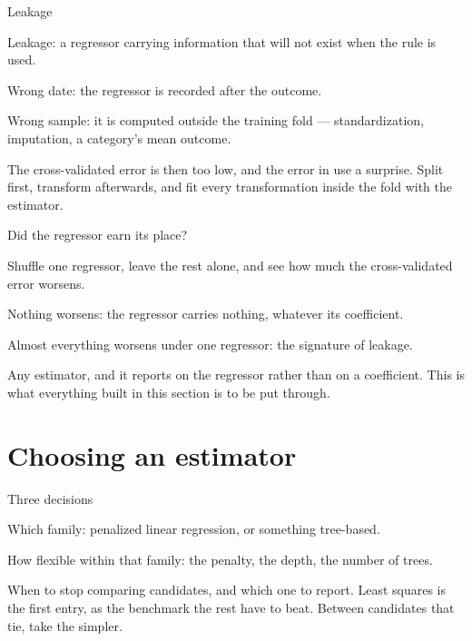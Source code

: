 \documentclass[aspectratio=169,11pt]{beamer}
\newenvironment{wideitemize}{\itemize\addtolength{\itemsep}{9pt}}{\enditemize}
\newcommand{\closingline}[1]{\vspace{0.9em}\noindent #1}
\begin{document}
\begin{frame}{Leakage}
\begin{wideitemize}
  \item Leakage: a regressor carrying information that will not exist when the
        rule is used.
  \item Wrong date: the regressor is recorded after the outcome.
  \item Wrong sample: it is computed outside the training fold ---
        standardization, imputation, a category's mean outcome.
  \item The cross-validated error is then too low, and the error in use a surprise.
\end{wideitemize}
\closingline{Split first, transform afterwards, and fit every transformation
inside the fold with the estimator.}
\end{frame}

\begin{frame}{Did the regressor earn its place?}
\begin{wideitemize}
  \item Shuffle one regressor, leave the rest alone, and see how much the
        cross-validated error worsens.
  \item Nothing worsens: the regressor carries nothing, whatever its coefficient.
  \item Almost everything worsens under one regressor: the signature of leakage.
  \item Any estimator, and it reports on the regressor rather than on a coefficient.
\end{wideitemize}
\closingline{This is what everything built in this section is to be put through.}
\end{frame}

\section{Choosing an estimator}

\begin{frame}{Three decisions}
\begin{wideitemize}
  \item Which family: penalized linear regression, or something tree-based.
  \item How flexible within that family: the penalty, the depth, the number
        of trees.
  \item When to stop comparing candidates, and which one to report.
\end{wideitemize}
\closingline{Least squares is the first entry, as the benchmark the rest have
to beat. Between candidates that tie, take the simpler.}
\end{frame}
\end{document}

